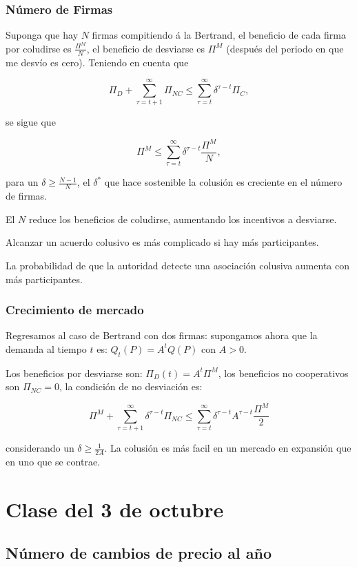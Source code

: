 \documentclass[letterpaper,12pt,twocolumn]{report}
\begin{document}
\subsubsection*{Número de Firmas}

Suponga que hay $N$ firmas compitiendo á la Bertrand, el beneficio de cada firma por coludirse es $\frac{\Pi^M}{N}$, el beneficio de desviarse es $\Pi^M$ (después del periodo en que me desvío es cero). Teniendo en cuenta que 

$$ \Pi_D + \sum^{\infty}_{\tau =t+1}\Pi_{NC} \leq \sum^{\infty}_{\tau=t}\delta^{\tau-t}\Pi_C,$$

se sigue que

$$ \Pi^M \leq \sum^{\infty}_{\tau=t}\delta^{\tau-t}\frac{\Pi^M}{N},$$

para un $\delta\geq\frac{N-1}{N}$, el $\delta^*$ que hace sostenible la colusión es creciente en el número de firmas. 

El \textuparrow $N$ reduce los beneficios de coludirse, aumentando los incentivos a desviarse.

Alcanzar un acuerdo colusivo es más complicado si hay más participantes.

La probabilidad de que la autoridad detecte una asociación colusiva aumenta con más participantes.

\subsubsection*{Crecimiento de mercado}

Regresamos al caso de Bertrand con dos firmas: supongamos ahora que la demanda al tiempo $t$ es: $Q_t(P)=A^tQ(P)$ con $A>0$. 

Los beneficios por desviarse son: $\Pi_D(t)=A^t\Pi^M$, los beneficios no cooperativos son $\Pi_{NC}=0$, la condición de no desviación es: 

$$ \Pi^M + \sum_{\tau=t+1}^{\infty}\delta^{\tau-t}\Pi_{NC}\leq \sum_{\tau=t}^{\infty}\delta^{\tau-t}A^{\tau-t}\frac{\Pi^M}{2} $$

considerando un $\delta \geq \frac{1}{2A}$. La colusión es más facil en un mercado en expansión que en uno que se contrae.


\section{Clase del 3 de octubre}

\subsection*{Número de cambios de precio al año}
\end{document}
